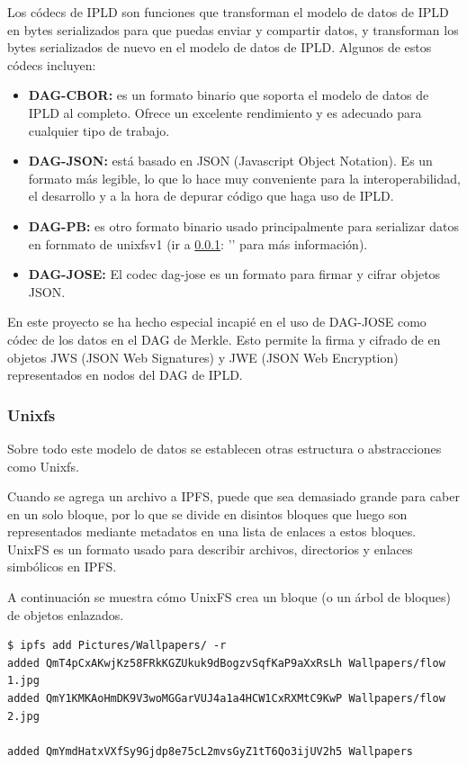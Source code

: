 Los códecs de IPLD son funciones que transforman el modelo de datos de IPLD en bytes serializados para que puedas enviar y compartir datos, y transforman los
bytes serializados de nuevo en el modelo de datos de IPLD. Algunos de estos códecs incluyen:

\begin{itemize}[itemsep=1pt,nolistsep]
      \item \textbf{DAG-CBOR:} es un formato binario que soporta el modelo de datos de IPLD al completo. Ofrece un excelente rendimiento y es adecuado para cualquier tipo de trabajo.
      \item \textbf{DAG-JSON:} está basado en JSON (Javascript Object Notation). Es un formato más legible, lo que lo hace muy conveniente para la interoperabilidad, el desarrollo y a la hora de depurar código que haga uso de IPLD.
      \item \textbf{DAG-PB:} es otro formato binario usado principalmente para serializar datos en fornmato de unixfsv1 (ir a \ref{subsect:unixfs}: '' para más información).
      \item \textbf{DAG-JOSE:} El codec dag-jose es un formato para firmar y cifrar objetos JSON.
\end{itemize}

En este proyecto se ha hecho especial incapié en el uso de DAG-JOSE como códec de los datos en el DAG de Merkle. Esto permite la firma y cifrado de
en objetos JWS (JSON Web Signatures) y JWE (JSON Web Encryption) representados en nodos del DAG de IPLD.

\subsubsection{Unixfs}\label{subsect:unixfs}
Sobre todo este modelo de datos se establecen otras estructura o abstracciones como Unixfs.

Cuando se agrega un archivo a IPFS, puede que sea demasiado grande para caber en un solo bloque, por lo que se divide en disintos bloques que luego son
representados mediante metadatos en una lista de enlaces a estos bloques. UnixFS es un formato usado para describir archivos, directorios y enlaces simbólicos en
IPFS. 

A continuación se muestra cómo UnixFS crea un bloque (o un árbol de bloques) de objetos enlazados.

\begin{verbatim}
$ ipfs add Pictures/Wallpapers/ -r
added QmT4pCxAKwjKz58FRkKGZUkuk9dBogzvSqfKaP9aXxRsLh Wallpapers/flow 1.jpg
added QmY1KMKAoHmDK9V3woMGGarVUJ4a1a4HCW1CxRXMtC9KwP Wallpapers/flow 2.jpg

added QmYmdHatxVXfSy9Gjdp8e75cL2mvsGyZ1tT6Qo3ijUV2h5 Wallpapers
\end{verbatim}

